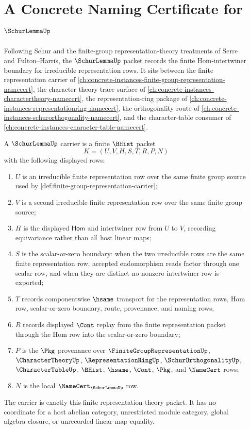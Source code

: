 \chapter{A Concrete Naming Certificate for $\SchurLemmaUp$}
\label{ch:concrete-instances-schur-lemma-namecert}

Following Schur and the finite-group representation-theory treatments of Serre and Fulton--Harris, the $\SchurLemmaUp$ packet records the finite Hom-intertwiner boundary for irreducible representation rows. It sits between the finite representation carrier of \autoref{ch:concrete-instances-finite-group-representation-namecert}, the character-theory trace surface of \autoref{ch:concrete-instances-charactertheory-namecert}, the representation-ring package of \autoref{ch:concrete-instances-representationring-namecert}, the orthogonality route of \autoref{ch:concrete-instances-schurorthogonality-namecert}, and the character-table consumer of \autoref{ch:concrete-instances-character-table-namecert}.

\begin{definition}
\label{def:schur-lemma-carrier}
A $\SchurLemmaUp$ carrier is a finite $\BHist$ packet
$$
K=(U,V,H,S,T,R,P,N)
$$
with the following displayed rows:
\begin{enumerate}
\item $U$ is an irreducible finite representation row over the same finite group source used by \autoref{def:finite-group-representation-carrier};
\item $V$ is a second irreducible finite representation row over the same finite group source;
\item $H$ is the displayed $\mathsf{Hom}$ and intertwiner row from $U$ to $V$, recording equivariance rather than all host linear maps;
\item $S$ is the scalar-or-zero boundary: when the two irreducible rows are the same finite representation row, accepted endomorphism reads factor through one scalar row, and when they are distinct no nonzero intertwiner row is exported;
\item $T$ records componentwise $\hsame$ transport for the representation rows, Hom row, scalar-or-zero boundary, route, provenance, and naming rows;
\item $R$ records displayed $\Cont$ replay from the finite representation packet through the Hom row into the scalar-or-zero boundary;
\item $P$ is the $\Pkg$ provenance over $\FiniteGroupRepresentationUp$, $\CharacterTheoryUp$, $\RepresentationRingUp$, $\SchurOrthogonalityUp$, $\CharacterTableUp$, $\BHist$, $\hsame$, $\Cont$, $\Pkg$, and $\NameCert$ rows;
\item $N$ is the local $\NameCert_{\SchurLemmaUp}$ row.
\end{enumerate}
The carrier is exactly this finite representation-theory packet. It has no coordinate for a host abelian category, unrestricted module category, global algebra closure, or unrecorded linear-map equality.
\end{definition}

